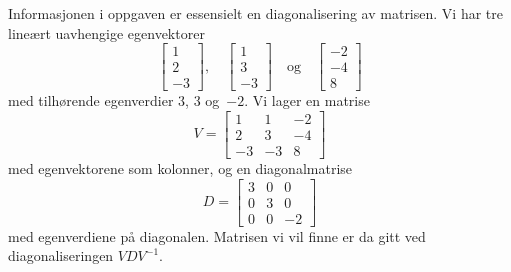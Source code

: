 \documentclass[notitlepage,a4paper,12pt,norsk]{IMFeksamen}
\newcommand{\vvv}[3]{\begin{bmatrix} #1 \\ #2 \\ #3 \end{bmatrix}}
\newcommand{\0}{\V{0}}
\newcommand{\oppgslutt}{
\begin{center}
\pgfornament[width=6cm]{88}
\end{center}
}
\newenvironment{losning}{\begin{oppgave}}{\oppgslutt\end{oppgave}}
\begin{document}
\begin{losning}
Informasjonen i oppgaven er essensielt en diagonalisering av matrisen.
Vi har tre lineært uavhengige egenvektorer
\[
\vvv{1}{2}{-3},\quad
\vvv{1}{3}{-3}\quad
\text{og}\quad
\vvv{-2}{-4}{8}
\]
med tilhørende egenverdier $3$, $3$ og~$-2$.  Vi lager en matrise
\[
V =
\begin{bmatrix}
 1 &  1 & -2 \\
 2 &  3 & -4 \\
-3 & -3 &  8
\end{bmatrix}
\]
med egenvektorene som kolonner, og en diagonalmatrise
\[
D =
\begin{bmatrix}
3 & 0 &  0 \\
0 & 3 &  0 \\
0 & 0 & -2
\end{bmatrix}
\]
med egenverdiene på diagonalen.  Matrisen vi vil finne er da gitt ved
diagonaliseringen $VDV^{-1}$.


\end{losning}
\end{document}
